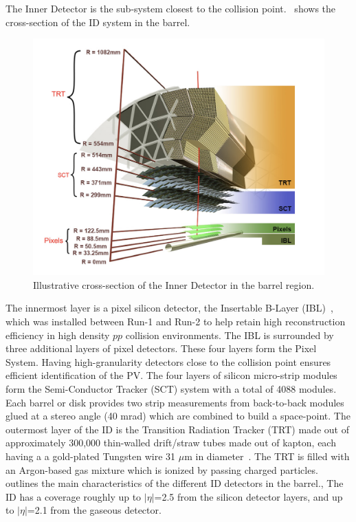 The Inner Detector is the sub-system closest to the collision point.~ shows the cross-section of the ID system in the barrel. 

\begin{figure}[!ht]
    \centering
    \includegraphics[width=0.8\linewidth]{figures/experiment/InnerDetector.png}
    \caption{Illustrative cross-section of the Inner Detector in the barrel region.~\cite{atlascollaboration2023software}}
    \label{fig:inner-det}
\end{figure}

The innermost layer is a pixel silicon detector, the Insertable B-Layer (IBL)~\cite{Capeans:1291633}, which was installed between Run-1 and Run-2 to help retain high reconstruction efficiency in high density $pp$ collision environments. The IBL is surrounded by three additional layers of pixel detectors. These four layers form the Pixel System. Having high-granularity detectors close to the collision point ensures efficient identification of the PV. The four layers of silicon micro-strip modules form the Semi-Conductor Tracker (SCT) system with a total of 4088 modules. Each barrel or disk provides two strip measurements from back-to-back modules glued at a stereo angle (40 mrad) which are combined to build a space-point. The outermost layer of the ID is the Transition Radiation Tracker (TRT) made out of approximately 300,000 thin-walled drift/straw tubes made out of kapton, each having a a gold-plated Tungsten wire 31 $\mu$m in diameter~\cite{CERN-LHCC-97-016}. The TRT is filled with an Argon-based gas mixture which is ionized by passing charged particles.  outlines the main characteristics of the different ID detectors in the barrel., The ID has a coverage roughly up to $|\eta|$=2.5 from the silicon detector layers, and up to $|\eta|$=2.1 from the gaseous detector.

